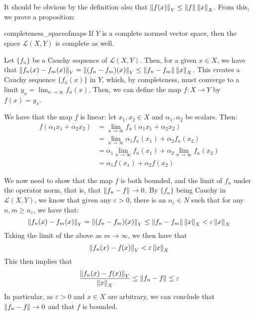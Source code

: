 It should be obvious by the definition also that \mbox{$\left\lVert f(x) \right\rVert_{Y} \leq \left\lVert f \right\rVert \left\lVert x \right\rVert_{X}$}. From this, we prove a proposition:
\begin{bprop}{}{completeness_spaceofmaps}
If $Y$ is a complete normed vector space, then the space $\mathcal{L}(X,Y)$ is complete as well.
\end{bprop}
\begin{bproof}{}{}
Let $\{f_{n}\}$ be a Cauchy sequence of $\mathcal{L}(X,Y)$. Then, for a given $x\in X$, we have that \mbox{$\left\lVert f_{n}(x) - f_{m}(x) \right\rVert_{Y} = \left\lVert (f_{n} - f_{m})(x) \right\rVert_{Y} \leq \left\lVert f_{n} - f_{m} \right\rVert \left\lVert x \right\rVert_{X}$}. This creates a Cauchy sequence $\{f_{n}(x)\}$ in $Y$, which, by completeness, must converge to a limit \mbox{$y_{x} = \lim_{n\to\infty}f_{n}(x)$}. Then, we can define the map \mbox{$f : X \to Y$} by \mbox{$f(x) = y_{x}$}.

We have that the map $f$ is linear: let \mbox{$x_{1},x_{2} \in X$} and \mbox{$\alpha_{1},\alpha_{2}$} be scalars. Then:
\begin{equation}
\begin{split}
    f(\alpha_{1} x_{1} + \alpha_{2} x_{2}) &= \lim_{n\to\infty} f_{n}(\alpha_{1} x_{1} + \alpha_{2} x_{2}) \\
     &= \lim_{n\to\infty} \alpha_{1} f_{n}(x_{1}) + \alpha_{2} f_{n}(x_{2}) \\
     &= \alpha_{1} \lim_{n\to\infty} f_{n}(x_{1}) + \alpha_{2} \lim_{n\to\infty} f_{n}(x_{2}) \\
     &= \alpha_{1} f(x_{1}) + \alpha_{2} f(x_{2})
\end{split}
\end{equation}

We now need to show that the map $f$ is both bounded, and the limit of $f_{n}$ under the operator norm, that is, that \mbox{$\left\lVert f_{n} - f_{} \right\rVert_{} \to 0$}. By $\{f_{n} \}$ being Cauchy in $\mathcal{L}(X,Y)$, we know that given any $\varepsilon>0$, there is an $n_{\varepsilon}\in N$ such that for any $n,m\geq n_{\varepsilon}$, we have that: \[ \left\lVert f_{n}(x) - f_{m}(x) \right\rVert_{Y} = \left\lVert (f_{n} - f_{m})(x) \right\rVert_{Y} \leq \left\lVert f_{n} - f_{m} \right\rVert \left\lVert x \right\rVert_{X} < \varepsilon \left\lVert x \right\rVert_{X} \]
Taking the limit of the above as $m\to\infty$, we then have that \[ \left\lVert f_{n}(x) - f_{}(x) \right\rVert_{Y}  < \varepsilon \left\lVert x \right\rVert_{X} \]
This then implies that \[ \frac{\left\lVert f_{n}(x) - f_{}(x) \right\rVert_{Y}}{\left\lVert x \right\rVert_{X}} \leq \left\lVert f_{n} - f_{} \right\rVert_{} \leq \varepsilon \]
In particular, as $\varepsilon>0$ and $x\in X$ are arbitrary, we can conclude that \mbox{$\left\lVert f_{n} - f_{} \right\rVert_{} \to 0$} and that $f$ is bounded. 
\eop
\end{bproof}

